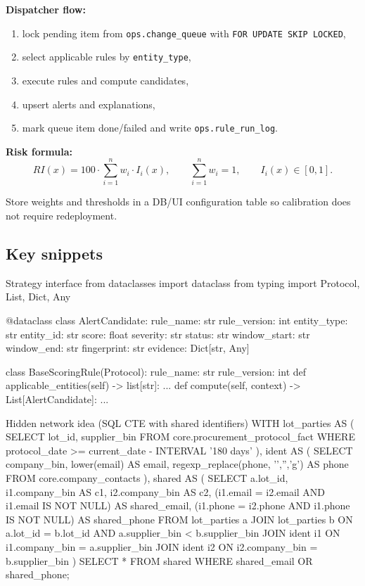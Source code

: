 \documentclass[11pt,a4paper]{article}
\begin{document}
\textbf{Dispatcher flow:}
\begin{enumerate}[leftmargin=1.5em]
  \item lock pending item from \texttt{ops.change\_queue} with \texttt{FOR UPDATE SKIP LOCKED},
  \item select applicable rules by \texttt{entity\_type},
  \item execute rules and compute candidates,
  \item upsert alerts and explanations,
  \item mark queue item done/failed and write \texttt{ops.rule\_run\_log}.
\end{enumerate}

\textbf{Risk formula:}
\[
RI(x) = 100 \cdot \sum_{i=1}^{n} w_i \cdot I_i(x), \qquad
\sum_{i=1}^{n} w_i = 1, \qquad
I_i(x) \in [0,1].
\]

Store weights and thresholds in a DB/UI configuration table so calibration does not require redeployment.

\subsection{Key snippets}
\begin{codeblock}[language=Python]{Strategy interface}
from dataclasses import dataclass
from typing import Protocol, List, Dict, Any

@dataclass
class AlertCandidate:
    rule_name: str
    rule_version: int
    entity_type: str
    entity_id: str
    score: float
    severity: str
    status: str
    window_start: str
    window_end: str
    fingerprint: str
    evidence: Dict[str, Any]

class BaseScoringRule(Protocol):
    rule_name: str
    rule_version: int
    def applicable_entities(self) -> list[str]: ...
    def compute(self, context) -> List[AlertCandidate]: ...
\end{codeblock}

\begin{codeblock}[language=SQL]{Hidden network idea (SQL CTE with shared identifiers)}
WITH lot_parties AS (
  SELECT lot_id, supplier_bin
  FROM core.procurement_protocol_fact
  WHERE protocol_date >= current_date - INTERVAL '180 days'
),
ident AS (
  SELECT company_bin, lower(email) AS email, regexp_replace(phone, '\D','','g') AS phone
  FROM core.company_contacts
),
shared AS (
  SELECT a.lot_id,
         i1.company_bin AS c1,
         i2.company_bin AS c2,
         (i1.email = i2.email AND i1.email IS NOT NULL) AS shared_email,
         (i1.phone = i2.phone AND i1.phone IS NOT NULL) AS shared_phone
  FROM lot_parties a
  JOIN lot_parties b
    ON a.lot_id = b.lot_id
   AND a.supplier_bin < b.supplier_bin
  JOIN ident i1 ON i1.company_bin = a.supplier_bin
  JOIN ident i2 ON i2.company_bin = b.supplier_bin
)
SELECT *
FROM shared
WHERE shared_email OR shared_phone;
\end{codeblock}
\end{document}
